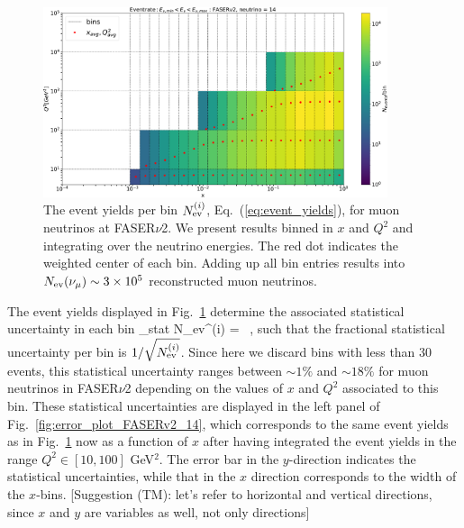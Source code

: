 \begin{figure}[t]
    \centering
\includegraphics[width=0.9\textwidth]{plots/Nevent_FASERv2_14.pdf}
\caption{The event yields per bin $ N_{\rm ev}^{(i)}$,  Eq.~(\ref{eq:event_yields}),
  for muon neutrinos at FASER$\nu$2.
  We present results binned in $x$ and $Q^2$ and integrating over the neutrino energies.
  The red dot indicates the weighted center of each bin.
  Adding up all bin entries results into $N_{\rm ev}(\nu_\mu)\sim 3\times 10^5 $ reconstructed muon
  neutrinos. }
    \label{fig:fasernu2_muon}
\end{figure}

The event yields displayed in Fig.~\ref{fig:fasernu2_muon} determine the associated
statistical uncertainty in each bin
\be
\label{eq:statistical_uncertainties}
\delta_{\rm stat}  N_{\rm ev}^{(i)} =  \, ,
\ee
such that the fractional statistical uncertainty per bin is $1/\sqrt{N_{\rm ev}^{(i)}}$.
%
Since here we discard bins with less than 30 events, this statistical uncertainty
ranges between $\sim 1\%$ and $\sim 18\%$ for muon neutrinos in FASER$\nu$2 depending on the values of
$x$ and $Q^2$ associated to this bin.
%
These statistical uncertainties are displayed in the left panel
of Fig.~\ref{fig:error_plot_FASERv2_14}, which corresponds
to the same event yields as in
Fig.~\ref{fig:fasernu2_muon}
now as a function of $x$ after having integrated the event yields in the range $Q^2 \in [10,100]$ GeV$^2$.
%
The error bar in the $y$-direction indicates the statistical uncertainties, while
that in the $x$ direction corresponds to the width of the $x$-bins. {\color{red}[Suggestion (TM): let's refer to horizontal and vertical directions, since $x$ and $y$ are variables as well, not only directions]}

